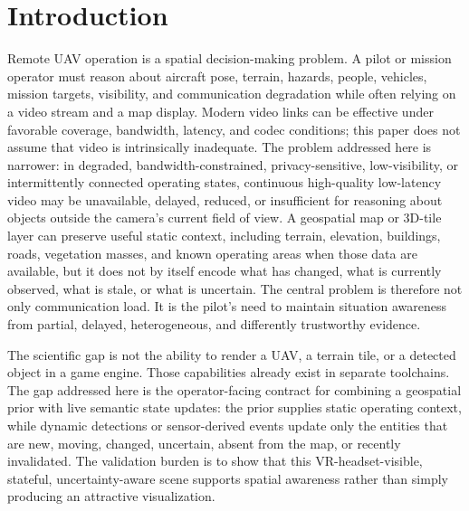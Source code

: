 \documentclass[fleqn]{VRIH2025}
\begin{document}

\maketitle

\section{Introduction}

Remote UAV operation is a spatial decision-making problem. A pilot or mission operator must reason about aircraft pose, terrain, hazards, people, vehicles, mission targets, visibility, and communication degradation while often relying on a video stream and a map display. Modern video links can be effective under favorable coverage, bandwidth, latency, and codec conditions; this paper does not assume that video is intrinsically inadequate. The problem addressed here is narrower: in degraded, bandwidth-constrained, privacy-sensitive, low-visibility, or intermittently connected operating states, continuous high-quality low-latency video may be unavailable, delayed, reduced, or insufficient for reasoning about objects outside the camera's current field of view. A geospatial map or 3D-tile layer can preserve useful static context, including terrain, elevation, buildings, roads, vegetation masses, and known operating areas when those data are available, but it does not by itself encode what has changed, what is currently observed, what is stale, or what is uncertain. The central problem is therefore not only communication load. It is the pilot's need to maintain situation awareness from partial, delayed, heterogeneous, and differently trustworthy evidence.

The scientific gap is not the ability to render a UAV, a terrain tile, or a detected object in a game engine. Those capabilities already exist in separate toolchains. The gap addressed here is the operator-facing contract for combining a geospatial prior with live semantic state updates: the prior supplies static operating context, while dynamic detections or sensor-derived events update only the entities that are new, moving, changed, uncertain, absent from the map, or recently invalidated. The validation burden is to show that this VR-headset-visible, stateful, uncertainty-aware scene supports spatial awareness rather than simply producing an attractive visualization.
\end{document}
